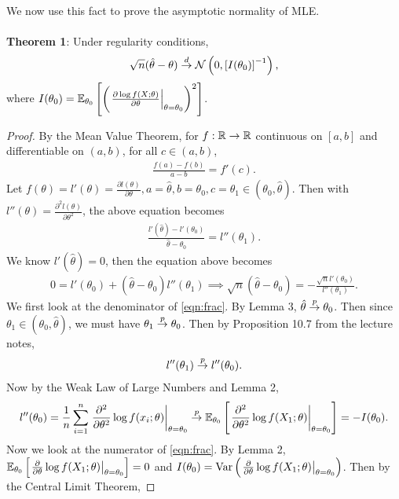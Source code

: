 $ $\\
We now use this fact to prove the asymptotic normality of MLE.\\\\
\textbf{Theorem 1}: Under regularity conditions, 
\begin{align}
\sqrt{n}(\hat{\theta} - \theta) \overset{d}{\rightarrow} \mathcal{N}\left(0, \left[ I(\theta_0) \right]^{-1}\right),
\end{align}
where $I(\theta_0) = \mathbb{E}_{\theta_0}\left[ \left( \left.\frac{\partial \log f(X;\theta)}{\partial\theta}\right\vert_{\theta=\theta_0} \right)^2 \right]$.
\begin{proof}
By the Mean Value Theorem, for $f:\mathbb{R} \rightarrow \mathbb{R}$ continuous on $[a,b]$ and differentiable on $(a,b)$, for all $c\in(a,b)$,
\begin{align}
\frac{f(a)-f(b)}{a-b} = f'(c).
\end{align}
Let $f(\theta) = l'(\theta) = \frac{\partial l(\theta)}{\partial \theta}, a=\hat{\theta}, b=\theta_0, c=\theta_1 \in (\theta_0, \hat{\theta})$. Then with $l''(\theta) = \frac{\partial^2 l(\theta)}{\partial \theta^2}$, the above equation becomes
\begin{align}
\frac{l'(\hat{\theta}) - l'(\theta_0)}{\hat{\theta} - \theta_0} = l''(\theta_1).
\end{align}
We know $l'(\hat{\theta}) = 0$, then the equation above becomes
\begin{align}
0 = l'(\theta_0) + (\hat{\theta} - \theta_0)l''(\theta_1) \implies \sqrt{n}(\hat{\theta} - \theta_0) = -\frac{\sqrt{n}l'(\theta_0)}{l''(\theta_1)}. \label{eqn:frac}
\end{align}
We first look at the denominator of \cref{eqn:frac}. By Lemma 3, $\hat{\theta} \overset{p}{\rightarrow} \theta_0$. Then since $\theta_1\in(\theta_0, \hat{\theta})$, we must have $\theta_1 \overset{p}{\rightarrow} \theta_0$. Then by Proposition 10.7 from the lecture notes, 
\begin{align}
l''(\theta_1) \overset{p}{\rightarrow} l''(\theta_0).
\end{align}
Now by the Weak Law of Large Numbers and Lemma 2,
\begin{align}
l''(\theta_0) = \frac{1}{n}\sum_{i=1}^n \left.\frac{\partial^2}{\partial \theta^2}\log f(x_i; \theta)\right\vert_{\theta=\theta_0} \overset{p}{\rightarrow} \mathbb{E}_{\theta_0}\left[ \left.\frac{\partial^2}{\partial \theta^2}\log f(X_1; \theta)\right\vert_{\theta=\theta_0} \right] = -I(\theta_0). \label{eqn:denom}
\end{align}
Now we look at the numerator of \cref{eqn:frac}. By Lemma 2, $\mathbb{E}_{\theta_0}\left[ \left.\frac{\partial}{\partial\theta}\log f(X_1;\theta)\right\vert_{\theta=\theta_0} \right] = 0$ and $I(\theta_0) = \text{Var}\left( \left.\frac{\partial}{\partial\theta}\log f(X_1;\theta)\right\vert_{\theta=\theta_0} \right)$. Then by the Central Limit Theorem,

\end{proof}
